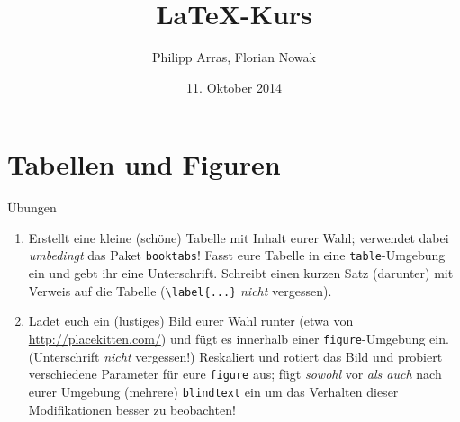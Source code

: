 \documentclass[11pt]{beamer}
\author{Philipp Arras, Florian Nowak}
\title{\LaTeX -Kurs}
\date{11. Oktober 2014}
\begin{document}


\section{Tabellen und Figuren}
\begin{frame}[fragile]{Übungen}
\begin{enumerate}
\item Erstellt eine kleine (schöne) Tabelle mit Inhalt eurer Wahl; verwendet dabei \emph{umbedingt} das Paket \texttt{booktabs}! Fasst eure Tabelle in eine \texttt{table}-Umgebung ein und gebt ihr eine Unterschrift. Schreibt einen kurzen Satz (darunter) mit Verweis auf die Tabelle (\verb~\label{...}~ \emph{nicht} vergessen).
\item Ladet euch ein (lustiges) Bild eurer Wahl runter (etwa von \url{http://placekitten.com/}) und fügt es innerhalb einer \texttt{figure}-Umgebung ein. (Unterschrift \emph{nicht} vergessen!) Reskaliert und rotiert das Bild und probiert verschiedene Parameter für eure \texttt{figure} aus; fügt \emph{sowohl} vor \emph{als auch} nach eurer Umgebung (mehrere) \texttt{blindtext} ein um das Verhalten dieser Modifikationen besser zu beobachten!
\end{enumerate}
\end{frame}
\end{document}
